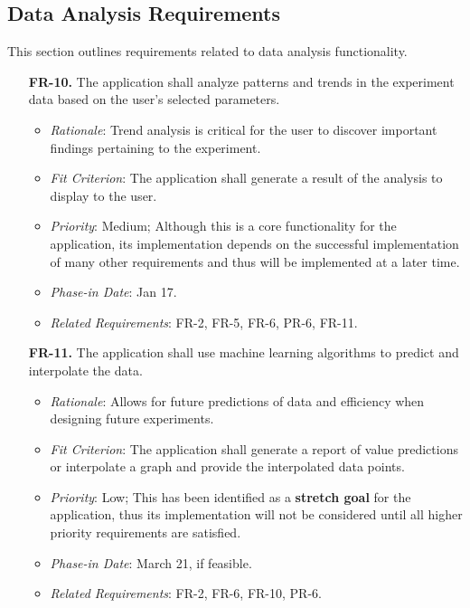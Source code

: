 \documentclass[12pt]{article}
\begin{document}
\subsection{Data Analysis Requirements}
This section outlines requirements related to data analysis functionality.
\begin{enumerate}
    \item[\textbf{FR-10.}] The application shall analyze patterns and trends in the experiment data based on the user’s selected parameters.
    \begin{itemize}
      \item \textit{Rationale}: Trend analysis is critical for the user to discover important findings pertaining to the experiment.
      \item \textit{Fit Criterion}: The application shall generate a result of the analysis to display to the user.
      \item \textit{Priority}: Medium; Although this is a core functionality for the application, its implementation depends on the successful implementation of many other requirements and thus will be implemented at a later time.
      \item \textit{Phase-in Date}: Jan 17.
      \item \textit{Related Requirements}: FR-2, FR-5, FR-6, PR-6, FR-11.
    \end{itemize}
    \item[\textbf{FR-11.}] The application shall use machine learning algorithms to predict and interpolate the data.
    \begin{itemize}
      \item \textit{Rationale}: Allows for future predictions of data and efficiency when designing future experiments.
      \item \textit{Fit Criterion}: The application shall generate a report of value predictions or interpolate a graph and provide the interpolated data points.
      \item \textit{Priority}: Low; This has been identified as a \textbf{stretch goal}
      for the application, thus its implementation will not be considered until all higher priority
      requirements are satisfied.
      \item \textit{Phase-in Date}: March 21, if feasible.
      \item \textit{Related Requirements}: FR-2, FR-6, FR-10, PR-6.
    \end{itemize}
\end{enumerate}
\end{document}
